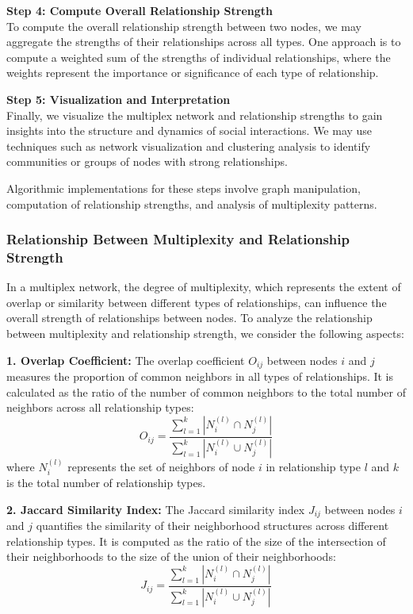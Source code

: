 \documentclass[12pt]{book} %
\begin{document}
\textbf{Step 4: Compute Overall Relationship Strength}\\
To compute the overall relationship strength between two nodes, we may aggregate the strengths of their relationships across all types. One approach is to compute a weighted sum of the strengths of individual relationships, where the weights represent the importance or significance of each type of relationship.

\textbf{Step 5: Visualization and Interpretation}\\
Finally, we visualize the multiplex network and relationship strengths to gain insights into the structure and dynamics of social interactions. We may use techniques such as network visualization and clustering analysis to identify communities or groups of nodes with strong relationships.

Algorithmic implementations for these steps involve graph manipulation, computation of relationship strengths, and analysis of multiplexity patterns.



\subsubsection{Relationship Between Multiplexity and Relationship Strength}

In a multiplex network, the degree of multiplexity, which represents the extent of overlap or similarity between different types of relationships, can influence the overall strength of relationships between nodes. To analyze the relationship between multiplexity and relationship strength, we consider the following aspects:

\textbf{1. Overlap Coefficient:} The overlap coefficient \(O_{ij}\) between nodes \(i\) and \(j\) measures the proportion of common neighbors in all types of relationships. It is calculated as the ratio of the number of common neighbors to the total number of neighbors across all relationship types:
\[
O_{ij} = \frac{\sum_{l=1}^{k} |N_i^{(l)} \cap N_j^{(l)}|}{\sum_{l=1}^{k} |N_i^{(l)} \cup N_j^{(l)}|}
\]
where \(N_i^{(l)}\) represents the set of neighbors of node \(i\) in relationship type \(l\) and \(k\) is the total number of relationship types.

\textbf{2. Jaccard Similarity Index:} The Jaccard similarity index \(J_{ij}\) between nodes \(i\) and \(j\) quantifies the similarity of their neighborhood structures across different relationship types. It is computed as the ratio of the size of the intersection of their neighborhoods to the size of the union of their neighborhoods:
\[
J_{ij} = \frac{\sum_{l=1}^{k} |N_i^{(l)} \cap N_j^{(l)}|}{\sum_{l=1}^{k} |N_i^{(l)} \cup N_j^{(l)}|}
\]
\end{document}
